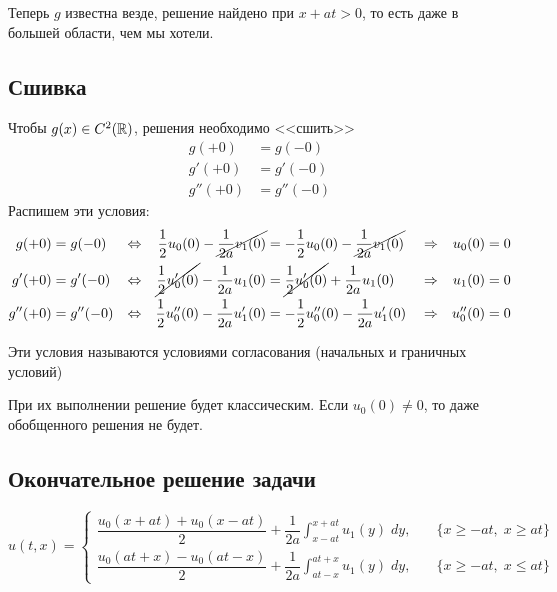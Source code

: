 \documentclass[../main.tex]{subfiles}
\begin{document}
Теперь $g$ известна везде, решение найдено при $x + at > 0$, то есть даже в большей области, чем мы хотели.


\subsection{Сшивка}
Чтобы $g(x) \in C^2(\mathbb{R})$, решения необходимо <<сшить>>
\begin{align*}
    g(+0) &= g(-0) \\
    g'(+0) &= g'(-0) \\
    g''(+0) &= g''(-0)
\end{align*}
Распишем эти условия:
\begin{align*}
     g(+0) &= g(-0) &\Leftrightarrow&& 
    \frac{1}{2}u_0(0) - \cancel{\frac{1}{2a}v_1(0)} &= -\frac{1}{2}u_0(0) - \cancel{\frac{1}{2a}v_1(0)} &&\Rightarrow& u_0(0) &= 0 \\
     g'(+0) &= g'(-0) &\Leftrightarrow&& \cancel{\frac{1}{2}u'_0(0)} - \frac{1}{2a}u_1(0) &=
    \cancel{\frac{1}{2}u'_0(0)} + \frac{1}{2a}u_1(0) &&\Rightarrow& u_1(0) &= 0 \\
     g''(+0) &= g''(-0) &\Leftrightarrow&& \frac{1}{2} u''_0(0) - \frac{1}{2a} u_1'(0) &= -\frac{1}{2}u_0''(0) - \frac{1}{2a} u_1'(0) &&\Rightarrow& u_0''(0) &= 0
\end{align*}

\begin{definition}
    Эти условия называются условиями согласования (начальных и граничных условий)
\end{definition}

При их выполнении решение будет классическим. Если $u_0(0) \ne 0$, то даже обобщенного решения не будет.

\subsection{Окончательное решение задачи}

\begin{equation} \label{4_2}
        u(t, x) = \begin{cases}
            \dfrac{u_0(x+at) + u_0(x-at)}{2} + \dfrac{1}{2a}\displaystyle\int_{x-at}^{x+at}u_1(y)\;dy,\quad & \{x\geq -at,\; x\geq at\} \\[1em]

            \dfrac{u_0(at+x) - u_0(at-x)}{2} + \dfrac{1}{2a}\displaystyle\int_{at-x}^{at+x}u_1(y)\;dy,\quad & \{x\geq -at,\; x\leq at\}
        \end{cases}
\end{equation}
\vspace{0pt}
\end{document}
